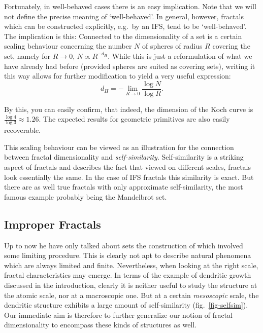 \documentclass[twocolumn, 10pt]{scrartcl}
\begin{document}
            Fortunately, in well-behaved cases there is an easy implication. Note that we will not define the precise
            meaning of `well-behaved'. In general, however, fractals which can be constructed explicitly, e.g.\ by
            an IFS, tend to be `well-behaved'. The implication is this: Connected to the dimensionality of a set
            is a certain scaling behaviour concerning the number $N$ of spheres of radius $R$ covering the set, namely
            for $R\rightarrow 0$, $N\propto R^{-d_H}$. While this is just a reformulation of what we have already had
            before (provided spheres are suited as covering sets), writing it this way allows for further modification
            to yield a very useful expression:
            \begin{equation}
                d_H=-\lim_{R\rightarrow 0}\frac{\log N}{\log R}.
                \label{eq-bcdimlim}
            \end{equation}

            By this, you can easily confirm, that indeed, the dimension of the Koch curve is
            $\frac{\log{4}}{\log{3}}\approx 1.26$. The expected results for geometric primitives are also easily
            recoverable.

            This scaling behaviour can be viewed as an illustration for the connection between fractal dimensionality
            and \emph{self-similarity}. Self-similarity is a striking aspect of fractals and describes the fact that
            viewed on different scales, fractals look essentially the same. In the case of IFS fractals this similarity
            is exact. But there are as well true fractals with only approximate self-similarity, the most famous
            example probably being the Mandelbrot set.

        \subsection{Improper Fractals}
            Up to now he have only talked about sets the construction of which involved some limiting procedure. This
            is clearly not apt to describe natural phenomena which are always limited and finite. Nevertheless, when
            looking at the right scale, fractal characteristics may emerge. In terms of the example of dendritic growth
            discussed in the introduction, clearly it is neither useful to study the structure at the atomic scale,
            nor at a macroscopic one. But at a certain \emph{mesoscopic} scale, the dendritic structure exhibits a large
            amount of self-similarity (fig.~\ref{fig-selfsim}). Our immediate aim is therefore to further generalize
            our notion of fractal dimensionality to encompass these kinds of structures as well.
            
\end{document}
